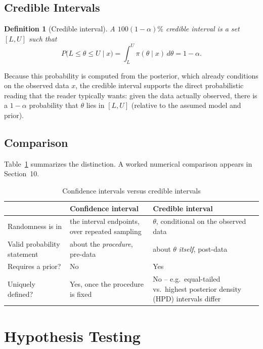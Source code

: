 \documentclass[11pt,a4paper]{article}
\newtheorem{definition}{Definition}[section]
\begin{document}
\subsection{Credible Intervals}
\begin{definition}[Credible interval]
A $100(1-\alpha)\%$ credible interval is a set $[L, U]$ such that
\begin{equation}
P\big(L \le \theta \le U \mid x\big) = \int_L^U \pi(\theta \mid x)\, d\theta = 1-\alpha.
\end{equation}
\end{definition}
Because this probability is computed from the posterior, which already conditions on the observed data $x$, the credible interval supports the direct probabilistic reading that the reader typically wants: given the data actually observed, there is a $1-\alpha$ probability that $\theta$ lies in $[L,U]$ (relative to the assumed model and prior).

\subsection{Comparison}
Table~\ref{tab:ci-vs-cri} summarizes the distinction. A worked numerical comparison appears in Section~10.

\begin{table}[h]
\centering
\caption{Confidence intervals versus credible intervals}
\label{tab:ci-vs-cri}
\begin{tabular}{@{}p{3.4cm}p{5.3cm}p{5.3cm}@{}}
\toprule
 & \textbf{Confidence interval} & \textbf{Credible interval} \\
\midrule
Randomness is in & the interval endpoints, over repeated sampling & $\theta$, conditional on the observed data \\
Valid probability statement & about the \emph{procedure}, pre-data & about $\theta$ \emph{itself}, post-data \\
Requires a prior? & No & Yes \\
Uniquely defined? & Yes, once the procedure is fixed & No -- e.g.\ equal-tailed vs.\ highest posterior density (HPD) intervals differ \\
\bottomrule
\end{tabular}
\end{table}

\section{Hypothesis Testing}
\end{document}
